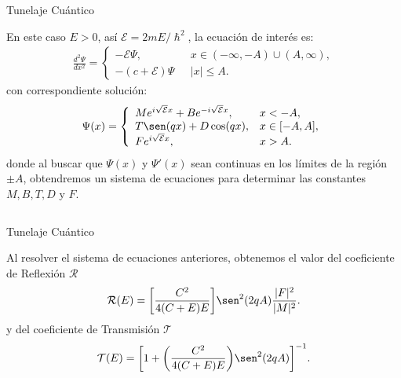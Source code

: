\documentclass[aspectratio=1610]{beamer}
\begin{document}
\begin{frame}{Tunelaje Cuántico}
   
En este caso $E > 0$, así $\mathcal{E} = 2mE/\hslash^2$, la ecuación de interés es:
\begin{align}
        \frac{d^2\Psi}{dx^2}= 
        \left\{ \begin{array}{ll}
        -\mathcal{E}\Psi,& \:\:\:  x \in (-\infty,-A)\cup (A,\infty),
        \\
        -(c+\mathcal{E})\Psi& \:\:\: |x| \leq A.
        \end{array}
        \right.
        \label{eq:SCsimple}
\end{align}
con correspondiente solución:
\begin{align}
        \Psi(x) = 
        \left\{ \begin{array}{ll}
        Me^{i\sqrt{\mathcal{E}}x}+Be^{-i\sqrt{\mathcal{E}}x}, & x<-A,
        \\
        T\sen(qx) + D\cos(qx), & x \in [-A,A],
        \\ Fe^{i\sqrt{\mathcal{E}}x},& x > A.
        \end{array}
        \right.
        \label{eq:Tunelaje}
\end{align}
donde al buscar que $\Psi(x)$ y $\Psi'(x)$ sean continuas en los límites de la región $\pm A$, obtendremos un sistema de ecuaciones para determinar las constantes $M, B, T, D$ y $F$. 

    
\begin{columns}
\column{37em}
\end{columns}
\end{frame}
\begin{frame}{Tunelaje Cuántico}
   
Al resolver el sistema de ecuaciones anteriores, obtenemos el valor del coeficiente de Reflexión $\mathcal{R}$
\begin{align*}
    \mathcal{R}(E) = \bigg[\frac{C^2}{4(C+E)E}\bigg]\sen^2(2qA)\frac{|F|^2}{|M|^2}.
\end{align*}
y del coeficiente de Transmisión $\mathcal{T}$
\begin{align*}
    \mathcal{T}(E) = 
    \bigg[1+\bigg(\frac{C^2}{4(C+E)E}\bigg)\sen^2(2qA)\bigg] ^{-1}.
\end{align*}

    
\begin{columns}
\column{37em}
\end{columns}
\end{frame}
\end{document}
